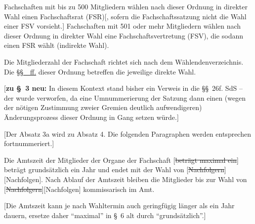 \documentclass[%
draft,%
multilinesections%
]{fswo}
\newcommand\oldT[1]  {{\color{Gray}[\st{#1}]}}
\newcommand\newT[1]  {{\color{Green}[#1]}}
\newcommand\bemFr[1] {{\color{Red}[#1]}}
\newcommand\bemFe[1] {{\color{Cyan}[#1]}}
\newcommand\oldT[1]{}%
\newcommand\newT[1]{#1}
\newcommand\bemFr[1]{}%
\newcommand\bemFe[1]{}%
\newcommand\change[2]{\oldT{#1}\newT{#2}}
\newcommand*{\refClauseFF}[1]{\hyperref[#1]{\S\S~\refClauseN{#1}~ff.}}
\begin{document}
\begin{contract}
Fachschaften mit bis zu 500 Mitgliedern wählen nach  dieser Ordnung in direkter Wahl einen Fachschaftsrat (FSR)\newT{, sofern die Fachschaftssatzung nicht die Wahl einer FSV vorsieht.}
Fachschaften mit 501 oder mehr Mitgliedern wählen nach  dieser Ordnung in direkter Wahl eine Fachschaftsvertretung (FSV), die sodann einen FSR wählt (indirekte Wahl).

Die Mitgliederzahl der Fachschaft richtet sich nach dem Wählendenverzeichnis.
Die \refClauseFF{cls-wahlsystem} dieser Ordnung betreffen die jeweilige direkte Wahl.
\end{contract}

\bemFr{\textbf{zu \S~3 neu:} In diesem Kontext stand bisher ein Verweis in die \S\S~26f. SdS – der wurde verworfen, da eine Umnummerierung der Satzung dann einen (wegen der nötigen Zustimmung zweier Gremien deutlich aufwendigeren) Änderungsprozess dieser Ordnung in Gang setzen würde.}

\bemFe{Der Absatz 3a wird zu Absatz 4. Die folgenden Paragraphen werden entsprechen fortnummeriert.}

\begin{contract}
Die Amtszeit der Mitglieder der Organe der Fachschaft \oldT{beträgt maximal ein} beträgt grundsätzlich ein Jahr und endet mit der Wahl von \change{Nachfolgern}{Nachfolgen}.
Nach Ablauf der Amtszeit bleiben die Mitglieder bis zur Wahl von \change{Nachfolgern}{Nachfolgen} kommissarisch im Amt.
\end{contract}

\bemFr{Die Amtszeit kann je nach Wahltermin auch geringfügig länger als ein Jahr dauern, ersetze daher \enquote{maximal} in \S~6 alt durch \enquote{grundsätzlich}.}
\end{document}
